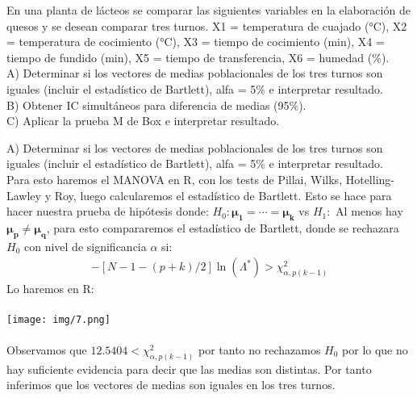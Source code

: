 \begin{problem}{3}
En una planta de lácteos se comparar las siguientes variables en la elaboración de quesos y se desean
comparar tres turnos.
X1 = temperatura de cuajado (°C), X2 = temperatura de cocimiento (°C),
X3 = tiempo de cocimiento (min), X4 = tiempo de fundido (min),
X5 = tiempo de transferencia, X6 = humedad (\%).\\
A) Determinar si los vectores de medias poblacionales de los tres turnos son iguales (incluir el
estadístico de Bartlett), alfa = 5\% e interpretar resultado.\\
B) Obtener IC simultáneos para diferencia de medias (95\%).\\
C) Aplicar la prueba M de Box e interpretar resultado.
\end{problem}
\begin{sol}
A) Determinar si los vectores de medias poblacionales de los tres turnos son iguales (incluir el
estadístico de Bartlett), alfa = 5\% e interpretar resultado.\\
Para esto haremos el MANOVA en R, con los tests de Pillai, Wilks, Hotelling-Lawley y Roy, luego calcularemos el estadístico de Bartlett. Esto se hace para hacer nuestra prueba de hipótesis donde:
$H_0:\bm{\mu_1}=\cdots = \bm{\mu_k}$ vs $H_1:$ Al menos hay $\bm{\mu_p} \neq \bm{\mu_q}$, para esto compararemos el estadístico de Bartlett, donde se rechazara $H_0$ con nivel de significancia $\alpha$ si:
\begin{align*}
-[N-1-(p+k)/2]\ln{(\Lambda^*)}>\chi_{\alpha,p(k-1)}^2
\end{align*}
Lo haremos en R:\\\\
\texttt{[image: img/7.png]}\\\\
Observamos que $12.5404 < \chi_{\alpha,p(k-1)}^2$ por tanto no rechazamos $H_0$ por lo que no hay suficiente evidencia para decir que las medias son distintas. Por tanto inferimos que los vectores de medias son iguales en los tres turnos. 

\pagebreak


\end{sol}
